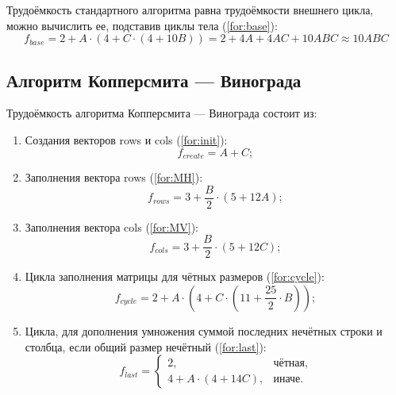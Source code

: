 Трудоёмкость стандартного алгоритма равна трудоёмкости внешнего цикла, можно вычислить ее, подставив циклы тела (\ref{for:base}):
\begin{equation}
    \label{for:base}
    f_{base} = 2 + A \cdot (4 + C \cdot (4 + 10B)) = 2 + 4A + 4AC + 10ABC \approx 10ABC
\end{equation}

\subsection{Алгоритм Копперсмита — Винограда}

Трудоёмкость алгоритма Копперсмита — Винограда состоит из:

\begin{enumerate}
    \item Создания векторов rows и cols (\ref{for:init}):
    \begin{equation}
        \label{for:init}
        f_{create} = A + C;
    \end{equation}

    \item Заполнения вектора rows (\ref{for:MH}):
    \begin{equation}
        \label{for:MH}
        f_{rows} = 3 + \frac{B}{2} \cdot (5 + 12A);
    \end{equation}

    \item Заполнения вектора cols (\ref{for:MV}):
    \begin{equation}
        \label{for:MV}
        f_{cols} = 3 + \frac{B}{2} \cdot (5 + 12C);
    \end{equation}

    \item Цикла заполнения матрицы для чётных размеров (\ref{for:cycle}):
    \begin{equation}
        \label{for:cycle}
        f_{cycle} = 2 + A \cdot (4 + C \cdot (11 + \frac{25}{2} \cdot B));
    \end{equation}

    \item Цикла, для дополнения умножения суммой последних нечётных строки и столбца, если общий размер нечётный (\ref{for:last}):
    \begin{equation}
        \label{for:last}
        f_{last} = \begin{cases}
                       2, & \text{чётная,}\\
                       4 + A \cdot (4 + 14C), & \text{иначе.}
        \end{cases}
    \end{equation}
\end{enumerate}

